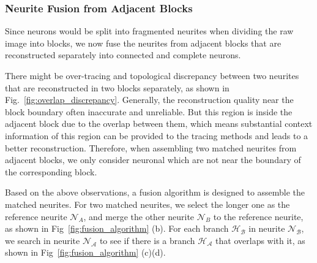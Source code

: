 \subsubsection{Neurite Fusion from Adjacent Blocks}
\label{sec:fusion}

Since neurons would be split into fragmented neurites when dividing the raw image into blocks, we now fuse the neurites from adjacent blocks that are reconstructed separately into connected and complete neurons.
 
There might be over-tracing and topological discrepancy between two neurites that are reconstructed in two blocks separately, as shown in Fig.~\ref{fig:overlap_discrepancy}.
Generally, the reconstruction quality near the block boundary often inaccurate and unreliable.
But this region is inside the adjacent block due to the overlap between them, which means substantial context information of this region can be provided to the tracing methods and leads to a better reconstruction.
%
Therefore, when assembling two matched neurites from adjacent blocks, we only consider neuronal  which are not near the boundary of the corresponding block. 





Based on the above observations, a fusion algorithm is designed to assemble the matched neurites.
For two matched neurites, we select the longer one as the reference neurite $\mathcal{N}_A$, and merge the other neurite $\mathcal{N}_B$ to the reference neurite, as shown in Fig~\ref{fig:fusion_algorithm} (b).
%
For each branch $\mathcal{H_B}$ in neurite $\mathcal{N_B}$, we search in neurite $\mathcal{N_A}$ to see if there is a branch $\mathcal{H_A}$ that overlaps with it, as shown in Fig~\ref{fig:fusion_algorithm} (c)(d).


